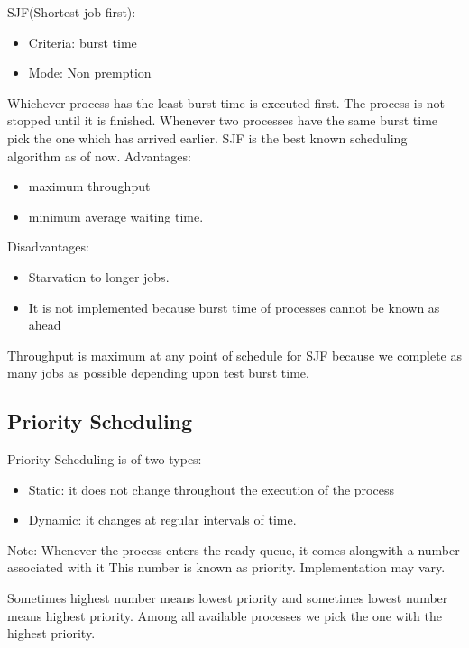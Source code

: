 \documentclass[12pt,letterpaper]{article}
\begin{document}
SJF(Shortest job first):
\begin{itemize}
	\item Criteria: burst time 
	\item Mode: Non premption
\end{itemize}
Whichever process has the least burst time is executed first. The process is not stopped until it is finished.
Whenever two processes have the same burst time pick the one which has arrived earlier. SJF is the best known scheduling algorithm as of now.
Advantages:
\begin{itemize}
	\item maximum throughput
	\item minimum average waiting time.
\end{itemize}
Disadvantages:
\begin{itemize}
	\item Starvation to longer jobs.
	\item It is not implemented because burst time of processes cannot be known as ahead \end{itemize}
Throughput is maximum at any point of schedule for SJF because we complete as many jobs as possible depending upon test burst time.

\subsection{Priority Scheduling}
Priority Scheduling is of two types: 
\begin{itemize}
  \item Static: it does not change throughout the execution of the process
  \item Dynamic: it changes at regular intervals of time. 
\end{itemize}

Note: Whenever the process enters the ready queue, it comes alongwith a number associated with it
This number is known as priority. Implementation may vary. 

Sometimes highest number means lowest priority and sometimes lowest number means highest priority. 
Among all available processes we pick the one with the highest priority. 
\end{document}
